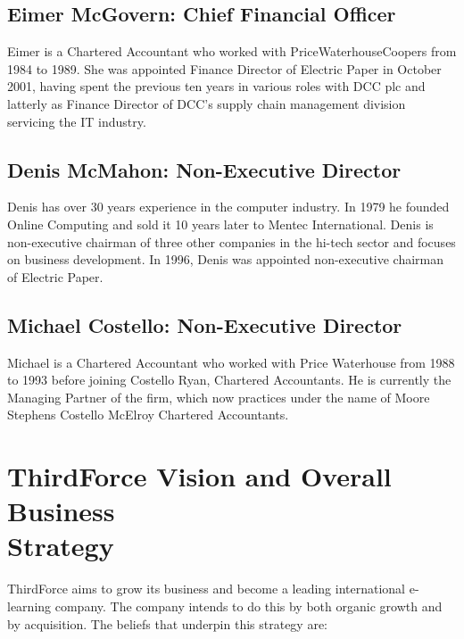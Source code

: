 \documentclass[a4paper,12pt]{article}
\begin{document}
\subsection*{Eimer McGovern: Chief Financial Officer}

Eimer is a Chartered Accountant who worked with PriceWaterhouseCoopers
from 1984 to 1989. She was appointed Finance Director of Electric Paper
in October 2001, having spent the previous ten years in various roles
with DCC plc and latterly as Finance Director of DCC's supply chain
management division servicing the IT industry.

\subsection*{Denis McMahon: Non-Executive Director}

Denis has over 30 years experience in the computer industry. In 1979 he
founded Online Computing and sold it 10 years later to Mentec
International. Denis is non-executive chairman of three other companies
in the hi-tech sector and focuses on business development. In 1996,
Denis was appointed non-executive chairman of Electric Paper.

\subsection*{Michael Costello: Non-Executive Director}

Michael is a Chartered Accountant who worked with Price Waterhouse from
1988 to 1993 before joining Costello Ryan, Chartered Accountants. He is
currently the Managing Partner of the firm, which now practices under
the name of Moore Stephens Costello McElroy Chartered Accountants.

\section*{ThirdForce Vision and Overall Business \\ Strategy}

ThirdForce aims to grow its business and become a leading international
e-learning company. The company intends to do this by both organic
growth and by acquisition. The beliefs that underpin this strategy are:
\end{document}
